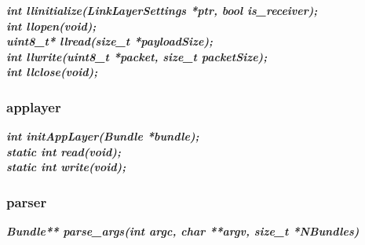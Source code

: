 \documentclass[a4paper]{article}
\begin{document}
\noindent\textbf{\textit{int llinitialize(LinkLayerSettings *ptr, bool
is\_receiver);}}\\

\noindent\textbf{\textit{int llopen(void);}}\\

\noindent\textbf{\textit{uint8\_t* llread(size\_t *payloadSize);}}\\

\noindent\textbf{\textit{int llwrite(uint8\_t *packet, size\_t packetSize);}}\\

\noindent\textbf{\textit{int llclose(void);}}\\

\subsubsection{applayer}
\noindent\textbf{\textit{int initAppLayer(Bundle *bundle);}}\\

\noindent\textbf{\textit{static int read(void);}}\\

\noindent\textbf{\textit{static int write(void);}}\\

\subsubsection{parser}

\noindent\textbf{\textit{Bundle** parse\_args(int argc, char **argv, size\_t *NBundles)}}\\
\end{document}
